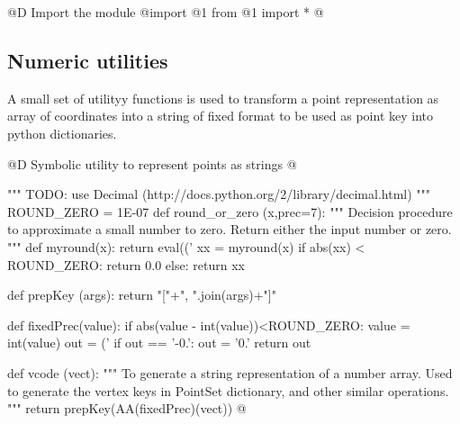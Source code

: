 \documentclass[11pt,oneside]{article}	%
\begin{document}
@D Import the module
@{import @1
from @1 import *
@}


\subsection{Numeric utilities}

A small set of utilityy functions is used to transform a point representation as array of coordinates into a string of fixed format to be used as point key into python dictionaries.

@D Symbolic utility to represent points as strings
@{""" TODO: 
use Decimal (http://docs.python.org/2/library/decimal.html) 
"""
ROUND_ZERO = 1E-07
def round_or_zero (x,prec=7):
	"""
	Decision procedure to approximate a small number to zero.
	Return either the input number or zero.
	"""
	def myround(x):
		return eval(('%
	xx = myround(x)
	if abs(xx) < ROUND_ZERO: return 0.0
	else: return xx

def prepKey (args): return "["+", ".join(args)+"]"

def fixedPrec(value):
	if abs(value - int(value))<ROUND_ZERO: value = int(value)
	out = ('%
	if out == '-0.': out = '0.'
	return out
	
def vcode (vect): 
	"""
	To generate a string representation of a number array.
	Used to generate the vertex keys in PointSet dictionary, and other 
	similar operations.
	"""
	return prepKey(AA(fixedPrec)(vect))
@}




\end{document}
